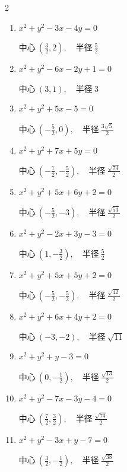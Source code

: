 \begin{multicols}{2}
\begin{enumerate}
  \item $x^{2}+y^{2}-3x-4y=0$

        $\displaystyle 中心\: \left(\frac{3}{2},2\right), \quad 半径 \ \frac{5}{2}$

  \item $x^{2}+y^{2}-6x-2y+1=0$

        $\displaystyle 中心\: \left(3,1\right), \quad 半径 \ 3$

  \item $x^{2}+y^{2}+5x-5=0$

        $\displaystyle 中心\: \left(-\frac{5}{2},0\right), \quad 半径 \ \frac{3\sqrt{5}}{2}$

  \item $x^{2}+y^{2}+7x+5y=0$

        $\displaystyle 中心\: \left(-\frac{7}{2},-\frac{5}{2}\right), \quad 半径 \ \frac{\sqrt{74}}{2}$

  \item $x^{2}+y^{2}+5x+6y+2=0$

        $\displaystyle 中心\: \left(-\frac{5}{2},-3\right), \quad 半径 \ \frac{\sqrt{53}}{2}$

  \item $x^{2}+y^{2}-2x+3y-3=0$

        $\displaystyle 中心\: \left(1,-\frac{3}{2}\right), \quad 半径 \ \frac{5}{2}$

  \item $x^{2}+y^{2}+5x+5y+2=0$

        $\displaystyle 中心\: \left(-\frac{5}{2},-\frac{5}{2}\right), \quad 半径 \ \frac{\sqrt{42}}{2}$

  \item $x^{2}+y^{2}+6x+4y+2=0$

        $\displaystyle 中心\: \left(-3,-2\right), \quad 半径 \ \sqrt{11}$

  \item $x^{2}+y^{2}+y-3=0$

        $\displaystyle 中心\: \left(0,-\frac{1}{2}\right), \quad 半径 \ \frac{\sqrt{13}}{2}$

  \item $x^{2}+y^{2}-7x-3y-4=0$

        $\displaystyle 中心\: \left(\frac{7}{2},\frac{3}{2}\right), \quad 半径 \ \frac{\sqrt{74}}{2}$

  \item $x^{2}+y^{2}-3x+y-7=0$

        $\displaystyle 中心\: \left(\frac{3}{2},-\frac{1}{2}\right), \quad 半径 \ \frac{\sqrt{38}}{2}$


\end{enumerate}
\end{multicols}
